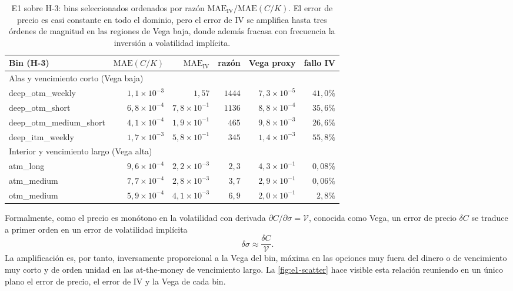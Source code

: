 \documentclass[11pt,a4paper]{article}
\begin{document}
\begin{table}[ht]
\centering
\small
\renewcommand{\arraystretch}{1.15}
\begin{tabular}{l r r r r r}
\toprule
Bin (H-3) & $\text{MAE}(C/K)$ & $\text{MAE}_{\text{IV}}$ & razón & Vega proxy & fallo IV \\
\midrule
\multicolumn{6}{l}{Alas y vencimiento corto (Vega baja)} \\
deep\_otm\_weekly        & $1{,}1\times 10^{-3}$ & $1{,}57$               & $1444$ & $7{,}3\times 10^{-5}$ & $41{,}0\%$ \\
deep\_otm\_short         & $6{,}8\times 10^{-4}$ & $7{,}8\times 10^{-1}$ & $1136$ & $8{,}8\times 10^{-4}$ & $35{,}6\%$ \\
deep\_otm\_medium\_short & $4{,}1\times 10^{-4}$ & $1{,}9\times 10^{-1}$ & $465$  & $9{,}8\times 10^{-3}$ & $26{,}6\%$ \\
deep\_itm\_weekly        & $1{,}7\times 10^{-3}$ & $5{,}8\times 10^{-1}$ & $345$  & $1{,}4\times 10^{-3}$ & $55{,}8\%$ \\
\midrule
\multicolumn{6}{l}{Interior y vencimiento largo (Vega alta)} \\
atm\_long                & $9{,}6\times 10^{-4}$ & $2{,}2\times 10^{-3}$ & $2{,}3$ & $4{,}3\times 10^{-1}$ & $0{,}08\%$ \\
atm\_medium              & $7{,}7\times 10^{-4}$ & $2{,}8\times 10^{-3}$ & $3{,}7$ & $2{,}9\times 10^{-1}$ & $0{,}06\%$ \\
otm\_medium              & $5{,}9\times 10^{-4}$ & $4{,}1\times 10^{-3}$ & $6{,}9$ & $2{,}0\times 10^{-1}$ & $2{,}8\%$  \\
\bottomrule
\end{tabular}
\caption{E1 sobre H-3: bins seleccionados ordenados por razón $\text{MAE}_{\text{IV}}/\text{MAE}(C/K)$. El error de precio es casi constante en todo el dominio, pero el error de IV se amplifica hasta tres órdenes de magnitud en las regiones de Vega baja, donde además fracasa con frecuencia la inversión a volatilidad implícita.}
\label{tab:e1}
\end{table}

Formalmente, como el precio es monótono en la volatilidad con derivada $\partial C / \partial \sigma = \mathcal{V}$, conocida como Vega, un error de precio $\delta C$ se traduce a primer orden en un error de volatilidad implícita
\begin{equation}
\delta \sigma \approx \frac{\delta C}{\mathcal{V}}.
\label{eq:iv-vega}
\end{equation}
La amplificación es, por tanto, inversamente proporcional a la Vega del bin, máxima en las opciones muy fuera del dinero o de vencimiento muy corto y de orden unidad en las at-the-money de vencimiento largo. La \autoref{fig:e1-scatter} hace visible esta relación reuniendo en un único plano el error de precio, el error de IV y la Vega de cada bin.
\end{document}
